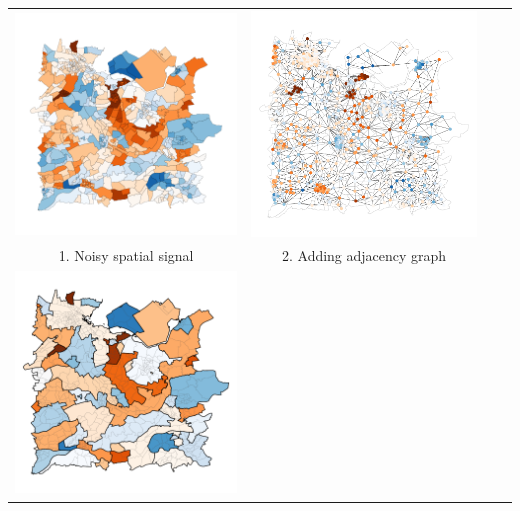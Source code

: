 \documentclass{standalone}
\begin{document}
\begin{tabular}[h]{cccc}
				\includegraphics[width = 7cm, keepaspectratio]{../figure/graphical_abstract/graphical_abstract_utrecht_district1.pdf} &
				\includegraphics[width = 7cm, keepaspectratio]{../figure/graphical_abstract/graphical_abstract_utrecht_district2.pdf}  \vspace{-0.5cm}\\
				1. Noisy spatial signal & 2. Adding adjacency graph \\
				\includegraphics[width = 7cm, keepaspectratio]{../figure/graphical_abstract/graphical_abstract_utrecht_district3.pdf} &

\end{tabular}
\end{document}
